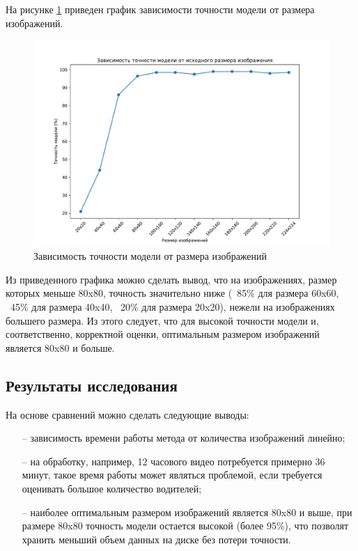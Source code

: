 На рисунке \ref{fig:sizes_acc_bench} приведен график зависимости точности модели от размера изображений.
\begin{figure}[hbtp]
	\centering
	\includegraphics[scale=0.6]{img/sizes_acc_bench.pdf}
	\caption{Зависимость точности модели от размера изображений}
	\label{fig:sizes_acc_bench}
\end{figure}

Из приведенного графика можно сделать вывод, что на изображениях, размер которых меньше 80x80, точность значительно ниже (~85\% для размера 60x60, ~45\% для размера 40x40, ~20\% для размера 20x20), нежели на изображениях большего размера. Из этого следует, что для высокой точности модели и, соответственно, корректной оценки, оптимальным размером изображений является 80x80 и больше.

\subsection{Результаты исследования}
На основе сравнений можно сделать следующие выводы:
\begin{itemize}[leftmargin=1.6\parindent]
	\item[--] зависимость времени работы метода от количества изображений линейно;
	\item[--] на обработку, например, 12 часового видео потребуется примерно 36 минут, такое время работы может являться проблемой, если требуется оценивать большое количество водителей;
	\item[--] наиболее оптимальным размером изображений является 80x80 и выше, при размере 80x80 точность модели остается высокой (более 95\%), что позволят хранить меньший объем данных на диске без потери точности.
\end{itemize}


\pagebreak
